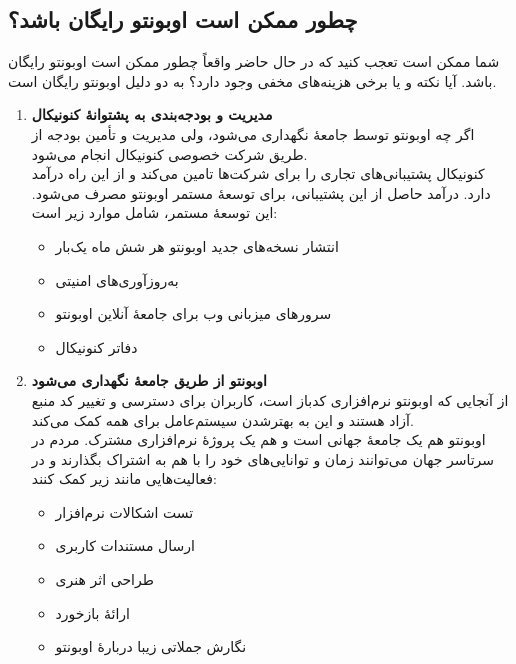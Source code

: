 \subsection{چطور ممکن است اوبونتو رایگان باشد؟}
شما ممکن است تعجب کنید که در حال حاضر واقعاً چطور ممکن است اوبونتو رایگان باشد. آیا نکته و یا برخی هزینه‌های مخفی وجود دارد؟ به دو دلیل اوبونتو رایگان است.\\
\begin{enumerate}
\item \textbf{مدیریت و بودجه‌بندی به پشتوانهٔ کنونیکال}\\
اگر چه  اوبونتو توسط جامعهٔ  نگهداری می‌شود، ولی مدیریت و تأمین بودجه از طریق شرکت خصوصی کنونیکال انجام می‌شود.\\
کنونیکال پشتیبانی‌های تجاری را برای شرکت‌ها تامین می‌کند و از این راه درآمد دارد. درآمد حاصل از این پشتیبانی، برای توسعهٔ مستمر اوبونتو مصرف می‌شود. این توسعهٔ مستمر، شامل موارد زیر است:
\begin{itemize}
\item انتشار نسخه‌های جدید اوبونتو هر شش ماه یک‌بار
\item به‌روزآوری‌های امنیتی
\item سرورهای میزبانی وب برای جامعهٔ آنلاین اوبونتو 
\item دفاتر کنونیکال
\end{itemize}
\item \textbf{اوبونتو از طریق جامعهٔ  نگهداری می‌شود}\\
از آنجایی که اوبونتو نرم‌افزاری کدباز است، کاربران برای دسترسی و تغییر کد منبع آزاد هستند و این به بهترشدن سیستم‌عامل برای همه کمک می‌کند.\\
اوبونتو هم یک جامعهٔ جهانی است و هم یک پروژهٔ نرم‌افزاری مشترک. مردم در سرتاسر جهان می‌توانند زمان و توانایی‌های خود را با هم به اشتراک بگذارند و در فعالیت‌هایی مانند زیر کمک کنند:
\begin{itemize}
\item تست اشکالات نرم‌افزار
\item ارسال مستندات کاربری
\item طراحی اثر هنری
\item ارائهٔ بازخورد
\item نگارش جملاتی زیبا دربارهٔ اوبونتو
\end{itemize}
\end{enumerate}

